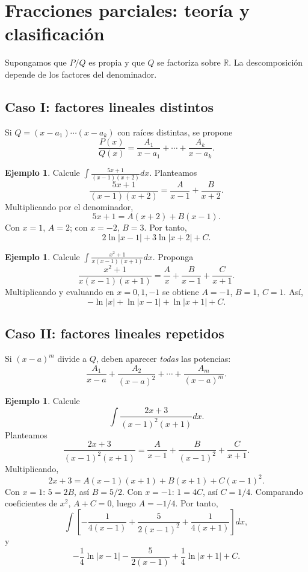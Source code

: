 \documentclass[12pt]{article}
\theoremstyle{definition}
\newtheorem{ejemplo}[teorema]{Ejemplo}
\theoremstyle{remark}
\newcommand{\R}{\mathbb{R}}
\begin{document}
\section{Fracciones parciales: teoría y clasificación}
Supongamos que $P/Q$ es propia y que $Q$ se factoriza sobre $\R$. La descomposición depende de los factores del denominador.
\subsection*{Caso I: factores lineales distintos}
Si $Q=(x-a_1)\cdots(x-a_k)$ con raíces distintas, se propone
\[\frac{P(x)}{Q(x)}=\frac{A_1}{x-a_1}+\cdots+\frac{A_k}{x-a_k}.\]
\begin{ejemplo}Calcule $\int\frac{5x+1}{(x-1)(x+2)}dx$. Planteamos
\[\frac{5x+1}{(x-1)(x+2)}=\frac{A}{x-1}+\frac{B}{x+2}.\]
Multiplicando por el denominador,
\[5x+1=A(x+2)+B(x-1).\]
Con $x=1$, $A=2$; con $x=-2$, $B=3$. Por tanto,
\[\boxed{2\ln|x-1|+3\ln|x+2|+C}.\]\end{ejemplo}
\begin{ejemplo}Calcule $\int\frac{x^2+1}{x(x-1)(x+1)}dx$. Proponga
\[\frac{x^2+1}{x(x-1)(x+1)}=\frac{A}{x}+\frac{B}{x-1}+\frac{C}{x+1}.\]
Multiplicando y evaluando en $x=0,1,-1$ se obtiene $A=-1$, $B=1$, $C=1$. Así,
\[\boxed{-\ln|x|+\ln|x-1|+\ln|x+1|+C}.\]\end{ejemplo}

\subsection*{Caso II: factores lineales repetidos}
Si $(x-a)^m$ divide a $Q$, deben aparecer \emph{todas} las potencias:
\[\frac{A_1}{x-a}+\frac{A_2}{(x-a)^2}+\cdots+\frac{A_m}{(x-a)^m}.\]
\begin{ejemplo}Calcule
\[\int\frac{2x+3}{(x-1)^2(x+1)}dx.\]
Planteamos
\[\frac{2x+3}{(x-1)^2(x+1)}=\frac{A}{x-1}+\frac{B}{(x-1)^2}+\frac{C}{x+1}.\]
Multiplicando,
\[2x+3=A(x-1)(x+1)+B(x+1)+C(x-1)^2.\]
Con $x=1$: $5=2B$, así $B=5/2$. Con $x=-1$: $1=4C$, así $C=1/4$. Comparando coeficientes de $x^2$, $A+C=0$, luego $A=-1/4$. Por tanto,
\[\int\left[-\frac1{4(x-1)}+\frac{5}{2(x-1)^2}+\frac1{4(x+1)}\right]dx,\]
y
\[\boxed{-\frac14\ln|x-1|-\frac{5}{2(x-1)}+\frac14\ln|x+1|+C}.\]\end{ejemplo}
\end{document}
